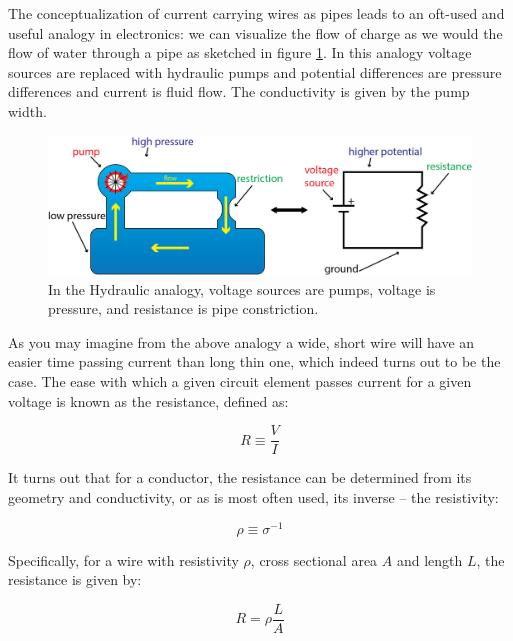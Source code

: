 \documentclass{tufte-book}
\begin{document}
The conceptualization of current carrying wires as pipes leads to an oft-used and useful analogy in electronics: we can visualize the flow of charge as we would the flow of water through a pipe as sketched in figure \ref{fig:water_analogy}. In this analogy voltage sources are replaced with hydraulic pumps and potential differences are pressure differences and current is fluid flow. The conductivity is given by the pump width. 

\begin{figure}[h]
\caption{In the Hydraulic analogy, voltage sources are pumps, voltage is pressure, and resistance is pipe constriction.}
\label{fig:water_analogy}
\begin{center}
\includegraphics[width=\textwidth]{waterpumpanalogy.png}
\end{center}
\end{figure}

As you may imagine from the above analogy a wide, short wire will have an easier time passing current than  long thin one, which indeed turns out to be the case. The ease with which a given circuit element passes current for a given voltage is known as the resistance, defined as:

\begin{equation}\label{eq:def_res_op}
R \equiv \frac{V}{I}
\end{equation}

It turns out that for a conductor, the resistance can be determined from its geometry and conductivity, or as is most often used, its inverse -- the resistivity:

\begin{equation}\label{eq:def_resistivity}
\rho \equiv \sigma^{-1}
\end{equation}

Specifically, for a wire with resistivity $\rho$, cross sectional area $A$ and length $L$, the resistance is given by:

\begin{equation}\label{eq:def_resistance}
R = \rho\frac{L}{A}
\end{equation}
\end{document}
